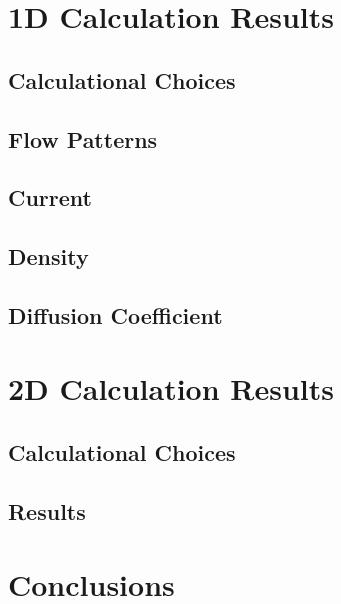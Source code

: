 \section{1D Calculation Results}
\subsection{Calculational Choices}
\subsection{Flow Patterns}
\subsection{Current}
\subsection{Density}
\subsection{Diffusion Coefficient}

\section{2D Calculation Results}
\subsection{Calculational Choices}
\subsection{Results}

\section{Conclusions}
